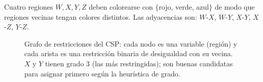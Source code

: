 \begin{example}
    Cuatro regiones $W, X, Y, Z$ deben colorearse con $\{$rojo, verde, azul$\}$ de modo que regiones vecinas tengan
    colores distintos. Las adyacencias son: $W$-$X$, $W$-$Y$, $X$-$Y$, $X$-$Z$, $Y$-$Z$.
\end{example}

\begin{figure}[H]
\centering
{}
\caption{Grafo de restricciones del CSP: cada nodo es una variable (región) y cada arista es una restricción binaria
de desigualdad con su vecina. $X$ y $Y$ tienen grado 3 (las más restringidas); son buenas candidatas para asignar
primero según la heurística de grado.}
\end{figure}
